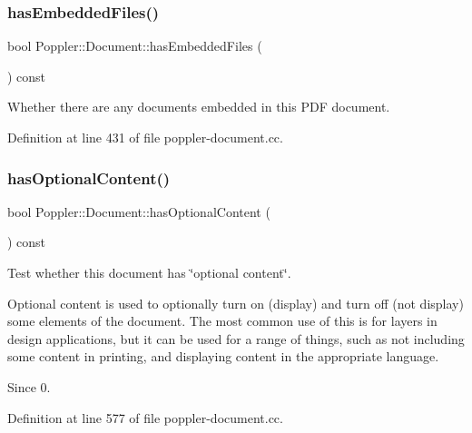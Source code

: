 \mbox{\label{class_poppler_1_1_document_ab64db4502e26726709d7385cf06823ee}} 
\subsubsection{\texorpdfstring{has\+Embedded\+Files()}{hasEmbeddedFiles()}}
{\footnotesize\ttfamily bool Poppler\+::\+Document\+::has\+Embedded\+Files (\begin{DoxyParamCaption}{ }\end{DoxyParamCaption}) const}

Whether there are any documents embedded in this P\+DF document. 

Definition at line 431 of file poppler-\/document.\+cc.

\mbox{\label{class_poppler_1_1_document_a2db8898b2818eecc73896195ef421a70}} 
\subsubsection{\texorpdfstring{has\+Optional\+Content()}{hasOptionalContent()}}
{\footnotesize\ttfamily bool Poppler\+::\+Document\+::has\+Optional\+Content (\begin{DoxyParamCaption}{ }\end{DoxyParamCaption}) const}

Test whether this document has \char`\"{}optional content\char`\"{}.

Optional content is used to optionally turn on (display) and turn off (not display) some elements of the document. The most common use of this is for layers in design applications, but it can be used for a range of things, such as not including some content in printing, and displaying content in the appropriate language.

\begin{DoxySince}{Since}
0. 
\end{DoxySince}


Definition at line 577 of file poppler-\/document.\+cc.

